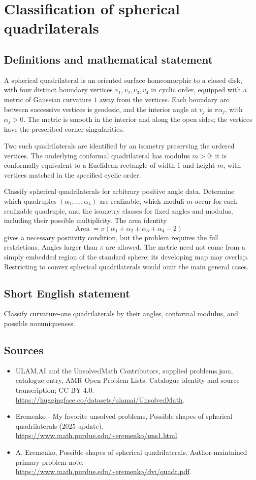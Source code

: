 \documentclass[11pt,a4paper]{article}
\begin{document}
\section*{Classification of spherical quadrilaterals}\label{statement}

\subsection{Definitions and mathematical statement}
A spherical quadrilateral is an oriented surface homeomorphic
to a closed disk, with four distinct boundary vertices
$v_1,v_2,v_3,v_4$ in cyclic order, equipped with a metric of
Gaussian curvature $1$ away from the vertices. Each boundary
arc between successive vertices is geodesic, and the interior
angle at $v_j$ is $\pi\alpha_j$, with $\alpha_j>0$.
The metric is smooth in the interior and along the open sides;
the vertices have the prescribed corner singularities.

Two such quadrilaterals are identified by an isometry preserving
the ordered vertices. The underlying conformal quadrilateral
has modulus $m>0$: it is conformally equivalent to a
Euclidean rectangle of width $1$ and height $m$, with
vertices matched in the specified cyclic order.

Classify spherical quadrilaterals for arbitrary positive angle
data. Determine which quadruples $(\alpha_1,\ldots,\alpha_4)$
are realizable, which moduli $m$ occur for each realizable
quadruple, and the isometry classes for fixed angles and
modulus, including their possible multiplicity.
The area identity
\[
           \operatorname{Area}=\pi
                         (\alpha_1+\alpha_2+\alpha_3+\alpha_4-2)
\]
gives a necessary positivity condition, but the problem
requires the full restrictions.
Angles larger than $\pi$ are allowed. The metric need not
come from a simply embedded region of the standard sphere;
its developing map may overlap. Restricting to convex
spherical quadrilaterals would omit the main general cases.
\subsection{Short English statement}
Classify curvature-one quadrilaterals by their angles, conformal modulus, and possible nonuniqueness.
\subsection{Sources}
\begin{itemize}
\item[S1] ULAM.AI and the UnsolvedMath Contributors, supplied problems.json, catalogue entry, AMR Open Problem Lists. Catalogue identity and source transcription; CC BY 4.0.
\url{https://huggingface.co/datasets/ulamai/UnsolvedMath}.
\item[S2] Eremenko - My favorite unsolved problems, Possible shapes of spherical quadrilaterals (2025 update). 
\url{https://www.math.purdue.edu/~eremenko/uns1.html}.
\item[S3] A. Eremenko, Possible shapes of spherical quadrilaterals. Author-maintained primary problem note.
\url{https://www.math.purdue.edu/~eremenko/dvi/quadr.pdf}.
\end{itemize}
\end{document}
